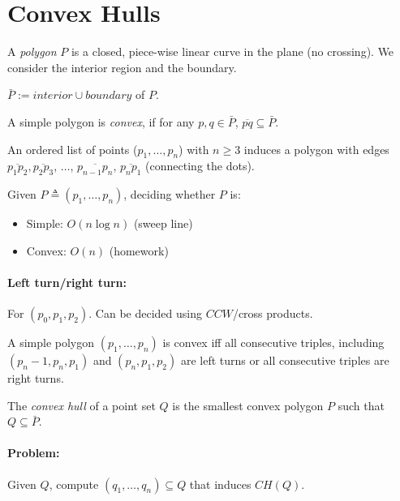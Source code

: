 \section{Convex Hulls}

A \emph{polygon} $P$ is a closed, piece-wise linear curve in the plane (no crossing). We consider the interior region and the boundary.

$\bar{P} := {interior} \cup {boundary}$ of $P$.

\noindent A simple polygon is \emph{convex}, if for any $p, q \in \bar{P}$, $\overline{pq} \subseteq \bar{P}$.

\medskip

\noindent An ordered list of points ($p_1, \ldots, p_n$) with $n \ge 3$ induces a polygon with edges $\overline{p_1 p_2}, \overline{p_2 p _3}$, $\ldots$, $\overline{p_{n-1} p_n}$, $\overline{p_n p_1}$ (connecting the dots).

\medskip

Given $P \triangleq (p_1, \ldots, p_n)$, deciding whether $P$ is:

\begin{itemize}
	\item Simple: $O(n \log n)$ (sweep line)
	\item Convex: $O(n)$ (homework)
\end{itemize}

\paragraph{Left turn/right turn: } For $(p_0, p_1, p_2)$. Can be decided using ${CCW}$/cross products.

\begin{myproposition}
A simple polygon $(p_1, \ldots, p_n)$ is convex iff all consecutive triples, including $(p_n-1, p_n, p_1)$ and $(p_n, p_1, p_2)$ are left turns or all consecutive triples are right turns.	
\end{myproposition}

\begin{mydefinition}
The \emph{convex hull} of a point set $Q$ is the smallest convex polygon $P$ such that $Q \subseteq \bar{P}$.
\end{mydefinition}

\paragraph{Problem:} Given $Q$, compute $(q_1, \ldots, q_n) \subseteq Q$ that induces ${CH}(Q)$.

